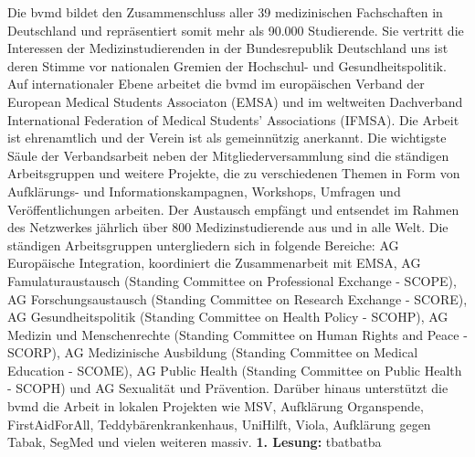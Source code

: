 {    Die bvmd bildet den Zusammenschluss aller 39 medizinischen Fachschaften in Deutschland und repräsentiert somit mehr als 90.000 Studierende. Sie vertritt die Interessen der Medizinstudierenden in der Bundesrepublik Deutschland uns ist deren Stimme vor nationalen Gremien der Hochschul- und Gesundheitspolitik. Auf internationaler Ebene arbeitet die bvmd im europäischen Verband der European Medical Students Associaton (EMSA) und im weltweiten Dachverband International Federation of Medical Students’ Associations (IFMSA). Die Arbeit ist ehrenamtlich und der Verein ist als gemeinnützig anerkannt. Die wichtigste Säule der Verbandsarbeit neben der Mitgliederversammlung sind die ständigen Arbeitsgruppen und weitere Projekte, die zu verschiedenen Themen in Form von Aufklärungs- und Informationskampagnen, Workshops, Umfragen und Veröffentlichungen arbeiten. Der Austausch empfängt und entsendet im Rahmen des Netzwerkes jährlich über 800 Medizinstudierende aus und in alle Welt. Die ständigen Arbeitsgruppen untergliedern sich in folgende Bereiche: AG Europäische Integration, koordiniert die Zusammenarbeit mit EMSA, AG Famulaturaustausch (Standing Committee on Professional Exchange - SCOPE), AG Forschungsaustausch (Standing Committee on Research Exchange - SCORE), AG Gesundheitspolitik (Standing Committee on Health Policy - SCOHP), AG Medizin und Menschenrechte (Standing Committee on Human Rights and Peace - SCORP), AG Medizinische Ausbildung (Standing Committee on Medical Education - SCOME), AG Public Health (Standing Committee on Public Health - SCOPH) und AG Sexualität und Prävention. Darüber hinaus unterstützt die bvmd die Arbeit in lokalen Projekten wie MSV, Aufklärung Organspende, FirstAidForAll, Teddybärenkrankenhaus, UniHilft, Viola, Aufklärung gegen Tabak, SegMed und vielen weiteren massiv.
}{
    \textbf{1. Lesung:}
}{tba}{tba}{tba}
